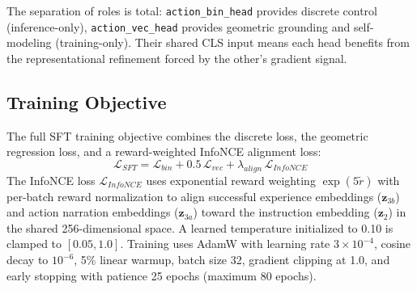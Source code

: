 \documentclass[letterpaper]{article} %
\begin{document}
The separation of roles is total: \texttt{action\_bin\_head} provides discrete control (inference-only), \texttt{action\_vec\_head} provides geometric grounding and self-modeling (training-only). Their shared CLS input means each head benefits from the representational refinement forced by the other's gradient signal.

\subsection{Training Objective}

The full SFT training objective combines the discrete loss, the geometric regression loss, and a reward-weighted InfoNCE alignment loss:
\begin{equation}
\mathcal{L}_{SFT} = \mathcal{L}_{bin} + 0.5\,\mathcal{L}_{vec} + \lambda_{align}\,\mathcal{L}_{InfoNCE}
\end{equation}
The InfoNCE loss $\mathcal{L}_{InfoNCE}$ uses exponential reward weighting $\exp(5\tilde{r})$ with per-batch reward normalization to align successful experience embeddings ($\mathbf{z}_{3b}$) and action narration embeddings ($\mathbf{z}_{3a}$) toward the instruction embedding ($\mathbf{z}_2$) in the shared 256-dimensional space. A learned temperature initialized to 0.10 is clamped to $[0.05, 1.0]$. Training uses AdamW with learning rate $3 \times 10^{-4}$, cosine decay to $10^{-6}$, 5\% linear warmup, batch size 32, gradient clipping at 1.0, and early stopping with patience 25 epochs (maximum 80 epochs).
\end{document}
